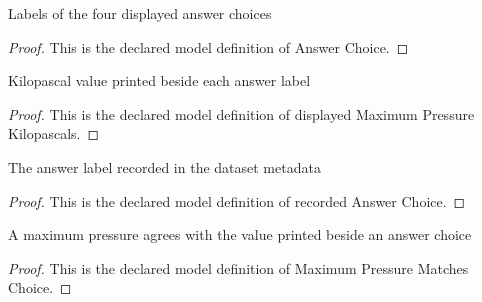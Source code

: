 \begin{definition}
  \label{def:physics:phyx-mini-0418:phyxminiproblems-problemphyxmini0418-answerchoice}
  Labels of the four displayed answer choices
\end{definition}
\begin{proof}
  This is the declared model definition of Answer Choice.
\end{proof}
\begin{definition}
  \label{def:physics:phyx-mini-0418:phyxminiproblems-problemphyxmini0418-displayedmaximumpressurekilopascals}
  Kilopascal value printed beside each answer label
\end{definition}
\begin{proof}
  This is the declared model definition of displayed Maximum Pressure Kilopascals.
\end{proof}
\begin{definition}
  \label{def:physics:phyx-mini-0418:phyxminiproblems-problemphyxmini0418-recordedanswerchoice}
  The answer label recorded in the dataset metadata
\end{definition}
\begin{proof}
  This is the declared model definition of recorded Answer Choice.
\end{proof}
\begin{definition}
  \label{def:physics:phyx-mini-0418:phyxminiproblems-problemphyxmini0418-maximumpressurematcheschoice}
  A maximum pressure agrees with the value printed beside an answer choice
\end{definition}
\begin{proof}
  This is the declared model definition of Maximum Pressure Matches Choice.
\end{proof}
